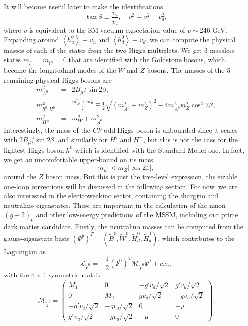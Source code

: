 It will become useful later to make the identifications
\begin{equation}
\tan{\beta}\equiv\frac{v_u}{v_d},\quad v^2=v^2_{u}+v^2_{d},
\end{equation}
where $v$ is equivalent to the SM vacuum expectation value of $v \sim 246$ GeV. Expanding around $\left\langle h^0_u\right\rangle \equiv v_u$ and $\left\langle h^0_d\right\rangle \equiv v_d$, we can compute the physical masses of each of the states from the two Higgs multiplets. We get 3 massless states $m_{\xi^0}=m_{\xi^{\pm}}=0$ that are identified with the Goldstone bosons, which become the longitudinal modes of the $W$ and $Z$ bosons. The masses of the 5 remaining physical Higgs bosons are
\begin{eqnarray}
m^2_{A^0}&=& 2B_{\mu}/\sin {2\beta}, \\
m^2_{h^0,H^0}&=& \frac{m^2_{A^0}+m^2_Z}{2} \mp \frac{1}{2}\sqrt{(m^2_{A^0}+m^2_Z)^2-4m^2_{A^0}m^2_Z \cos^2{2\beta}}, \\
m^2_{H^{\pm}}&=&m^2_W + m^2_{A^0}.
\end{eqnarray}
Interestingly, the mass of the $CP$-odd Higgs boson is unbounded since it scales with $2B_{\mu}/\sin {2\beta}$, and similarly for $H^0$ and $H^{\pm}$, but this is not the case for the lightest Higgs boson $h^0$ which is identified with the Standard Model one. In fact, we get an uncomfortable upper-bound on its mass
\begin{equation}
m_{h^0} < m_Z |\cos {2\beta}|,
\label{eqn:mhtree}
\end{equation}
around the $Z$ boson mass. But this is just the tree-level expression, the sizable one-loop corrections will be discussed in the following section. For now, we are also interested in the electroweakino sector, containing the chargino and neutralino eigenstates. These are important in the calculation of the muon $(g-2)_{\mu}$ and other low-energy predictions of the MSSM, including our prime dark matter candidate. Firstly, the neutralino masses can be computed from the gauge-eigenstate basis $(\Psi^0)^T = (\tilde{B}^0,\tilde{W}^0,\tilde{H}^0_d,\tilde{H}^0_u)$, which contributes to the Lagrangian as
\begin{equation}
\mathcal{L}_{\tilde{\chi}^0}=-\frac{1}{2} (\Psi^0)^T \mathcal{M}_{\tilde{\chi}^0} \Psi^0 + c.c.,
\end{equation}
with the 4 x 4 symmetric matrix
\begin{equation}
\mathcal{M}_{\tilde{\chi}^0}=
\begin{pmatrix}
M_1 &  0 &  -g'v_d/\sqrt2 & g'v_u/\sqrt2 \\ 
 0 &  M_2 & gv_d/\sqrt2 & -gv_u/\sqrt2 \\ 
 -g'v_d/\sqrt2 & -gv_d/\sqrt2 &  0 & -\mu \\ 
 g'v_u/\sqrt2 & -gv_u/\sqrt2 &  -\mu & 0
\end{pmatrix}.
\label{eqn:neutralinoMM}
\end{equation}
